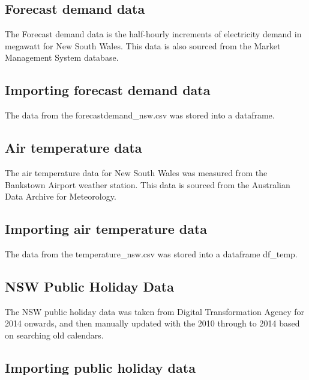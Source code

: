 \documentclass[mstat,12pt]{unswthesis}
\begin{document}
\hypertarget{forecast-demand-data}{%
\subsection{Forecast demand data}\label{forecast-demand-data}}

The Forecast demand data is the half-hourly increments of electricity
demand in megawatt for New South Wales. This data is also sourced from
the Market Management System database.

\hypertarget{importing-forecast-demand-data}{%
\subsection{Importing forecast demand
data}\label{importing-forecast-demand-data}}

The data from the forecastdemand\_nsw.csv was stored into a dataframe.

\hypertarget{air-temperature-data}{%
\subsection{Air temperature data}\label{air-temperature-data}}

The air temperature data for New South Wales was measured from the
Bankstown Airport weather station. This data is sourced from the
Australian Data Archive for Meteorology.

\hypertarget{importing-air-temperature-data}{%
\subsection{Importing air temperature
data}\label{importing-air-temperature-data}}

The data from the temperature\_nsw.csv was stored into a dataframe
df\_temp.

\hypertarget{nsw-public-holiday-data}{%
\subsection{NSW Public Holiday Data}\label{nsw-public-holiday-data}}

The NSW public holiday data was taken from Digital Transformation Agency
for 2014 onwards, and then manually updated with the 2010 through to
2014 based on searching old calendars\cite{_australian}.

\hypertarget{importing-public-holiday-data}{%
\subsection{Importing public holiday
data}\label{importing-public-holiday-data}}
\end{document}
